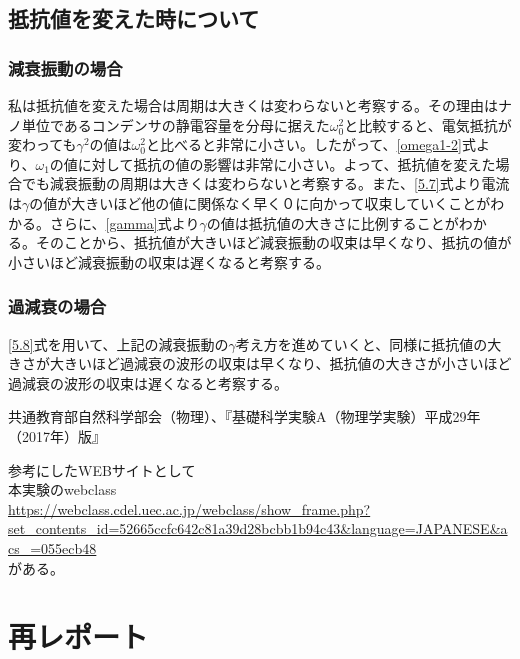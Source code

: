 \documentclass{jsarticle}
\begin{document}
\subsection{抵抗値を変えた時について}

\subsubsection{減衰振動の場合}
私は抵抗値を変えた場合は周期は大きくは変わらないと考察する。その理由はナノ単位であるコンデンサの静電容量を分母に据えた$\omega_0^2$と比較すると、電気抵抗が変わっても$\gamma^2$の値は$\omega_0^2$と比べると非常に小さい。したがって、\ref{omega1-2}式より、$\omega_1$の値に対して抵抗の値の影響は非常に小さい。よって、抵抗値を変えた場合でも減衰振動の周期は大きくは変わらないと考察する。また、\ref{5.7}式より電流は$\gamma$の値が大きいほど他の値に関係なく早く０に向かって収束していくことがわかる。さらに、\ref{gamma}式より$\gamma$の値は抵抗値の大きさに比例することがわかる。そのことから、抵抗値が大きいほど減衰振動の収束は早くなり、抵抗の値が小さいほど減衰振動の収束は遅くなると考察する。

\subsubsection{過減衰の場合}
\ref{5.8}式を用いて、上記の減衰振動の$\gamma$考え方を進めていくと、同様に抵抗値の大きさが大きいほど過減衰の波形の収束は早くなり、抵抗値の大きさが小さいほど過減衰の波形の収束は遅くなると考察する。


\begin{thebibliography}{99}
     共通教育部自然科学部会（物理）、『基礎科学実験A（物理学実験）平成29年（2017年）版』
\end{thebibliography}

参考にしたWEBサイトとして\\

本実験のwebclass\\
\url{https://webclass.cdel.uec.ac.jp/webclass/show_frame.php?set_contents_id=52665ccfc642c81a39d28bcbb1b94c43&language=JAPANESE&acs_=055ecb48}\\

がある。

\newpage

\section{再レポート}
\end{document}

